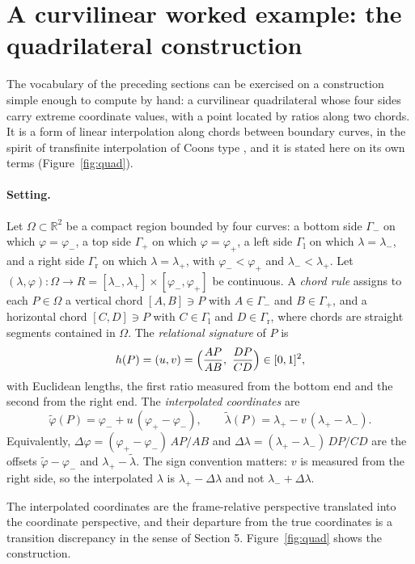 \documentclass[11pt]{article}
\theoremstyle{remark}
\newcommand{\R}{\mathbb{R}}
\begin{document}
\section{A curvilinear worked example: the quadrilateral construction}\label{sec:quad}

The vocabulary of the preceding sections can be exercised on a construction simple enough to compute by hand: a curvilinear quadrilateral whose four sides carry extreme coordinate values, with a point located by ratios along two chords. It is a form of linear interpolation along chords between boundary curves, in the spirit of transfinite interpolation of Coons type \cite{coons}, and it is stated here on its own terms (Figure~\ref{fig:quad}).

\paragraph{Setting.} Let $\Omega\subset\R^2$ be a compact region bounded by four curves: a bottom side $\Gamma_-$ on which $\varphi=\varphi_-$, a top side $\Gamma_+$ on which $\varphi=\varphi_+$, a left side $\Gamma_{\mathrm l}$ on which $\lambda=\lambda_-$, and a right side $\Gamma_{\mathrm r}$ on which $\lambda=\lambda_+$, with $\varphi_-<\varphi_+$ and $\lambda_-<\lambda_+$. Let $(\lambda,\varphi):\Omega\to R=[\lambda_-,\lambda_+]\times[\varphi_-,\varphi_+]$ be continuous. A \emph{chord rule} assigns to each $P\in\Omega$ a vertical chord $[A,B]\ni P$ with $A\in\Gamma_-$ and $B\in\Gamma_+$, and a horizontal chord $[C,D]\ni P$ with $C\in\Gamma_{\mathrm l}$ and $D\in\Gamma_{\mathrm r}$, where chords are straight segments contained in $\Omega$. The \emph{relational signature} of $P$ is
\[
h(P)=(u,v)=\Bigl(\frac{AP}{AB},\ \frac{DP}{CD}\Bigr)\in[0,1]^2,
\]
with Euclidean lengths, the first ratio measured from the bottom end and the second from the right end. The \emph{interpolated coordinates} are
\[
\tilde\varphi(P)=\varphi_-+u\,(\varphi_+-\varphi_-),\qquad
\tilde\lambda(P)=\lambda_+-v\,(\lambda_+-\lambda_-).
\]
Equivalently, $\Delta\varphi=(\varphi_+-\varphi_-)\,AP/AB$ and $\Delta\lambda=(\lambda_+-\lambda_-)\,DP/CD$ are the offsets $\tilde\varphi-\varphi_-$ and $\lambda_+-\tilde\lambda$. The sign convention matters: $v$ is measured from the right side, so the interpolated $\lambda$ is $\lambda_+-\Delta\lambda$ and not $\lambda_-+\Delta\lambda$.

The interpolated coordinates are the frame-relative perspective translated into the coordinate perspective, and their departure from the true coordinates is a transition discrepancy in the sense of Section 5. Figure~\ref{fig:quad} shows the construction.
\end{document}
